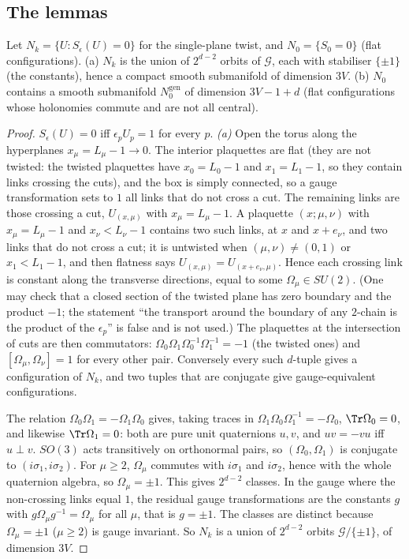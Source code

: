 \subsection{The lemmas}
\begin{lemma}\label{lem:A}
Let $N_k=\{U:S_\epsilon(U)=0\}$ for the single-plane twist, and $N_0=\{S_0=0\}$ (flat configurations). (a) $N_k$ is the union of $2^{d-2}$ orbits of $\mathcal G$, each with stabiliser $\{\pm1\}$ (the constants), hence a compact smooth submanifold of dimension $3V$. (b) $N_0$ contains a smooth submanifold $N_0^{\mathrm{gen}}$ of dimension $3V-1+d$ (flat configurations whose holonomies commute and are not all central).
\end{lemma}
\begin{proof}
$S_\epsilon(U)=0$ iff $\epsilon_pU_p=1$ for every $p$. \emph{(a)} Open the torus along the hyperplanes $x_\mu=L_\mu-1\to0$. The interior plaquettes are flat (they are not twisted: the twisted plaquettes have $x_0=L_0-1$ and $x_1=L_1-1$, so they contain links crossing the cuts), and the box is simply connected, so a gauge transformation sets to $1$ all links that do not cross a cut. The remaining links are those crossing a cut, $U_{(x,\mu)}$ with $x_\mu=L_\mu-1$. A plaquette $(x;\mu,\nu)$ with $x_\mu=L_\mu-1$ and $x_\nu<L_\nu-1$ contains two such links, at $x$ and $x+e_\nu$, and two links that do not cross a cut; it is untwisted when $(\mu,\nu)\ne(0,1)$ or $x_1<L_1-1$, and then flatness says $U_{(x,\mu)}=U_{(x+e_\nu,\mu)}$. Hence each crossing link is constant along the transverse directions, equal to some $\Omega_\mu\in SU(2)$. (One may check that a closed section of the twisted plane has zero boundary and the product $-1$; the statement ``the transport around the boundary of any $2$-chain is the product of the $\epsilon_p$'' is false and is not used.) The plaquettes at the intersection of cuts are then commutators: $\Omega_0\Omega_1\Omega_0^{-1}\Omega_1^{-1}=-1$ (the twisted ones) and $[\Omega_\mu,\Omega_\nu]=1$ for every other pair. Conversely every such $d$-tuple gives a configuration of $N_k$, and two tuples that are conjugate give gauge-equivalent configurations.

The relation $\Omega_0\Omega_1=-\Omega_1\Omega_0$ gives, taking traces in $\Omega_1\Omega_0\Omega_1^{-1}=-\Omega_0$, $\Tr\Omega_0=0$, and likewise $\Tr\Omega_1=0$: both are pure unit quaternions $u,v$, and $uv=-vu$ iff $u\perp v$. $SO(3)$ acts transitively on orthonormal pairs, so $(\Omega_0,\Omega_1)$ is conjugate to $(i\sigma_1,i\sigma_2)$. For $\mu\ge2$, $\Omega_\mu$ commutes with $i\sigma_1$ and $i\sigma_2$, hence with the whole quaternion algebra, so $\Omega_\mu=\pm1$. This gives $2^{d-2}$ classes. In the gauge where the non-crossing links equal $1$, the residual gauge transformations are the constants $g$ with $g\Omega_\mu g^{-1}=\Omega_\mu$ for all $\mu$, that is $g=\pm1$. The classes are distinct because $\Omega_\mu=\pm1$ ($\mu\ge2$) is gauge invariant. So $N_k$ is a union of $2^{d-2}$ orbits $\mathcal G/\{\pm1\}$, of dimension $3V$.


\end{proof}

